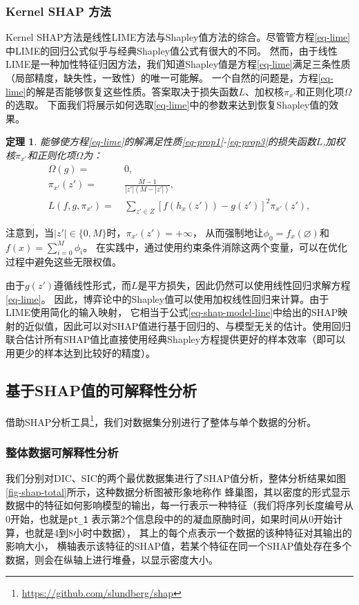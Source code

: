 \documentclass[12pt, a4paper, oneside]{ctexart}
\newtheorem{theorem}{定理}[section] %
\numberwithin{equation}{section}  %
\def\add{\vspace{1ex}}      %
\begin{document}
\subsubsection{Kernel SHAP 方法}
Kernel SHAP方法是线性LIME方法与Shapley值方法的综合。尽管管方程\ref{eq-lime}中LIME的回归公式似乎与经典Shapley值公式有很大的不同。
然而，由于线性LIME是一种加性特征归因方法，我们知道Shapley值是方程\ref{eq-lime}满足三条性质（局部精度，缺失性，一致性）的唯一可能解。
一个自然的问题是，方程\ref{eq-lime}的解是否能够恢复这些性质。答案取决于损失函数$L$、加权核$\pi_{x'}$和正则化项$\Omega$的选取。
下面我们将展示如何选取\ref{eq-lime}中的参数来达到恢复Shapley值的效果。
\begin{theorem}
    能够使方程\ref{eq-lime}的解满足性质\ref{eq-prop1}-\ref{eq-prop3}的损失函数$L$,加权核$\pi_{x'}$和正则化项$\Omega$为：
    \begin{align*}
        \Omega(g) =&\ 0,\\
        \pi_{x'}(z') =&\ \frac{M-1}{|z'|(M-|z'|)},\\
        L(f,g,\pi_{x'}) =&\ \sum_{z'\in Z}[f(h_x(z'))-g(z')]^2\pi_{x'}(z'),
    \end{align*}
\end{theorem}
注意到，当$|z'|\in\{0,M\}$时，$\pi_{x'}(z')=+\infty$，
从而强制地让$\phi_0 = f_x(\varnothing)$和$f(x)=\sum\limits_{i=0}^{M}\phi_i$。\add
在实践中，通过使用约束条件消除这两个变量，可以在优化过程中避免这些无限权值。


由于$g(z')$遵循线性形式，而$L$是平方损失，因此仍然可以使用线性回归求解方程\ref{eq-lime}。
因此，博弈论中的Shapley值可以使用加权线性回归来计算。由于LIME使用简化的输入映射，
它相当于公式\ref{eq-shap-model-line}中给出的SHAP映射的近似值，因此可以对SHAP值进行基于回归的、与模型无关的估计。使用回归联合估计所有SHAP值比直接使用经典Shapley方程提供更好的样本效率（即可以用更少的样本达到比较好的精度）。
\subsection{基于SHAP值的可解释性分析}
借助SHAP分析工具\footnote{\url{https://github.com/slundberg/shap}}，我们对数据集分别进行了整体与单个数据的分析。
\subsubsection{整体数据可解释性分析}
我们分别对DIC、SIC的两个最优数据集进行了SHAP值分析，整体分析结果如图\ref{fig-shap-total}所示，这种数据分析图被形象地称作
蜂巢图，其以密度的形式显示数据中的特征如何影响模型的输出，每一行表示一种特征（我们将序列长度编号从0开始，也就是\texttt{pt\_1}
表示第2个信息段中的的凝血原酶时间，如果时间从0开始计算，也就是4到8小时中数据），
其上的每个点表示一个数据的该种特征对其输出的影响大小，
横轴表示该特征的SHAP值，若某个特征在同一个SHAP值处存在多个数据，则会在纵轴上进行堆叠，以显示密度大小。
\end{document}
